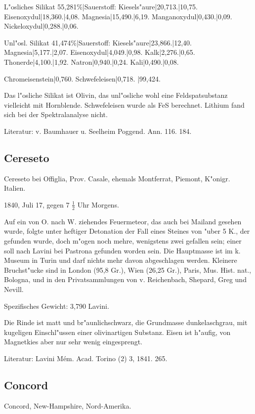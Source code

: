 \documentclass[a4paper, 11pt, oneside]{article}
\begin{document}
L"osliches Silikat 55,281\%|Sauerstoff:  
Kiesels"aure|20,713.|10,75.  
Eisenoxydul|18,360.|4,08.  
Magnesia|15,490.|6,19.  
Manganoxydul|0,430.|0,09.  
Nickeloxydul|0,288.|0,06.  

Unl"osl. Silikat 41,474\%|Sauerstoff:  
Kiesels"aure|23,866.|12,40.  
Magnesia|5,177.|2,07.  
Eisenoxydul|4,049.|0,98.  
Kalk|2,276.|0,65.  
Thonerde|4,100.|1,92.  
Natron|0,940.|0,24.  
Kali|0,490.|0,08.

Chromeisenstein|0,760.  
Schwefeleisen|0,718.  
|99,424.

Das l"osliche Silikat ist Olivin, das unl"osliche wohl eine Feldspatsubstanz vielleicht mit Hornblende. Schwefeleisen wurde als FeS berechnet. Lithium fand sich bei der Spektralanalyse nicht.

Literatur: v. Baumhauer u. Seelheim Poggend. Ann. 116. 184.

\subsection{Cereseto}

Cereseto bei Offiglia, Prov. Casale, ehemals Montferrat, Piemont, K"onigr. Italien.

1840, Juli 17, gegen 7 $\frac{1}{2}$ Uhr Morgens.

Auf ein von O. nach W. ziehendes Feuermeteor, das auch bei Mailand gesehen wurde, folgte unter heftiger Detonation der Fall eines Steines von "uber 5 K., der gefunden wurde, doch m"ogen noch mehre, wenigstens zwei gefallen sein; einer soll nach Lavini bei Pastrona gefunden worden sein. Die Hauptmasse ist im k. Museum in Turin und darf nichts mehr davon abgeschlagen werden. Kleinere Bruchst"ucke sind in London (95,8 Gr.), Wien (26,25 Gr.), Paris, Mus. Hist. nat., Bologna, und in den Privatsammlungen von v. Reichenbach, Shepard, Greg und Nevill.

Spezifisches Gewicht: 3,790 Lavini.

Die Rinde ist matt und br"aunlichschwarz, die Grundmasse dunkelaschgrau, mit kugeligen Einschl"ussen einer olivinartigen Substanz. Eisen ist h"aufig, von Magnetkies aber nur sehr wenig eingesprengt.

Literatur: Lavini Mém. Acad. Torino (2) 3, 1841. 265.

\subsection{Concord}

Concord, New-Hampshire, Nord-Amerika.
\end{document}
